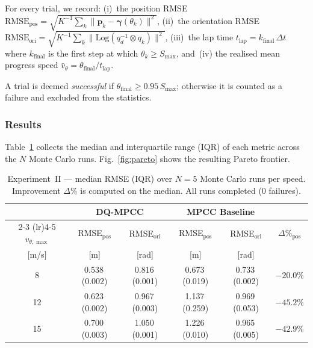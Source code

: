 For every trial, we record:
(i)~the position RMSE
    $\text{RMSE}_{\text{pos}} =
     \sqrt{K^{-1}\sum_{k}\|\mathbf{p}_k - \boldsymbol{\gamma}(\theta_k)\|^2}$,
(ii)~the orientation RMSE
    $\text{RMSE}_{\text{ori}} =
     \sqrt{K^{-1}\sum_{k}\|\mathrm{Log}(q_d^{-1}\otimes q_k)\|^2}$,
(iii)~the lap time
    $t_{\text{lap}} = k_{\text{final}}\,\Delta t$
    where $k_{\text{final}}$ is the first step at which
    $\theta_k \ge S_{\max}$,
and~(iv) the realised mean progress speed
    $\bar v_\theta = \theta_{\text{final}} / t_{\text{lap}}$.

A trial is deemed \emph{successful} if
$\theta_{\text{final}} \ge 0.95\,S_{\max}$;
otherwise it is counted as a failure and excluded from
the statistics.


\subsubsection{Results}

Table~\ref{tab:exp2} collects the median and interquartile
range (IQR) of each metric across the $N$ Monte Carlo runs.
Fig.~\ref{fig:pareto} shows the resulting Pareto frontier.

\begin{table}[t]
  \centering
  \caption{Experiment~II — median RMSE (IQR) over $N=5$ Monte Carlo
           runs per speed.  Improvement $\Delta\%$ is computed on
           the median.  All runs completed ($0$ failures).}
  \label{tab:exp2}
  \setlength{\tabcolsep}{3pt}
  \footnotesize
  \begin{tabular}{c cc cc c}
    \toprule
    & \multicolumn{2}{c}{\textbf{DQ-MPCC}}
    & \multicolumn{2}{c}{\textbf{MPCC Baseline}}
    & \\
    \cmidrule(lr){2-3} \cmidrule(lr){4-5}
    $v_{\theta,\max}$
    & {RMSE$_{\text{pos}}$}
    & {RMSE$_{\text{ori}}$}
    & {RMSE$_{\text{pos}}$}
    & {RMSE$_{\text{ori}}$}
    & {$\Delta\%_{\text{pos}}$} \\
    {[m/s]}
    & {[m]}
    & {[rad]}
    & {[m]}
    & {[rad]}
    & \\
    \midrule
    8
    & 0.538\,{\scriptsize(0.002)}
    & 0.816\,{\scriptsize(0.001)}
    & 0.673\,{\scriptsize(0.019)}
    & 0.733\,{\scriptsize(0.002)}
    & $-20.0\%$ \\
    12
    & 0.623\,{\scriptsize(0.002)}
    & 0.967\,{\scriptsize(0.003)}
    & 1.137\,{\scriptsize(0.259)}
    & 0.969\,{\scriptsize(0.053)}
    & $-45.2\%$ \\
    15
    & 0.700\,{\scriptsize(0.003)}
    & 1.050\,{\scriptsize(0.001)}
    & 1.226\,{\scriptsize(0.010)}
    & 0.965\,{\scriptsize(0.005)}
    & $-42.9\%$ \\
    \bottomrule
  \end{tabular}
\end{table}

